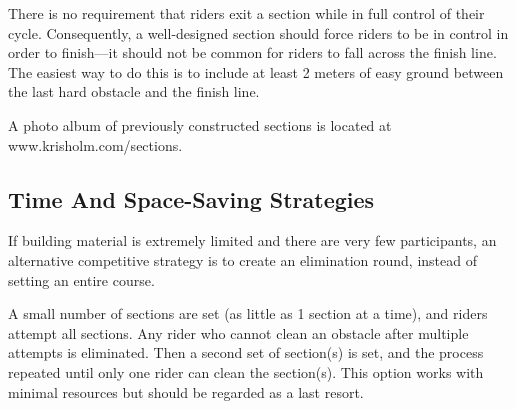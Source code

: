 There is no requirement that riders exit a section while in full control of their cycle. 
Consequently, a well-designed section should force riders to be in control in order to finish---it should not be common for riders to fall across the finish line. 
The easiest way to do this is to include at least 2 meters of easy ground between the last hard obstacle and the finish line.

A photo album of previously constructed sections is located at www.krisholm.com/sections.

\subsection{Time And Space-Saving Strategies}
If building material is extremely limited and there are very few participants, an alternative competitive strategy is to create an elimination round, instead of setting an entire course.

A small number of sections are set (as little as 1 section at a time), and riders attempt all sections. 
Any rider who cannot clean an obstacle after multiple attempts is eliminated. 
Then a second set of section(s) is set, and the process repeated until only one rider can clean the section(s). 
This option works with minimal resources but should be regarded as a last resort.